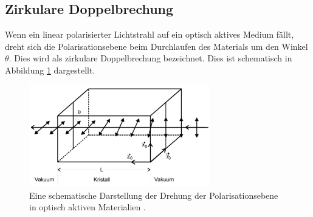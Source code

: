 \subsection{Zirkulare Doppelbrechung}

\noindent Wenn ein linear polarisierter Lichtstrahl auf ein optisch aktives Medium fällt, dreht sich die Polarisationsebene beim Durchlaufen des Materials um den Winkel $\theta$.
Dies wird als zirkulare Doppelbrechung bezeichnet. Dies ist schematisch in Abbildung \ref{img:zirk} dargestellt.

\begin{figure}[H]
    \centering
    \includegraphics[width=0.7\textwidth]{latex/images/zirk.PNG}
    \caption{Eine schematische Darstellung der Drehung der Polarisationsebene in optisch aktiven Materialien  \protect \cite{anhang}.}
    \label{img:zirk}
\end{figure}

